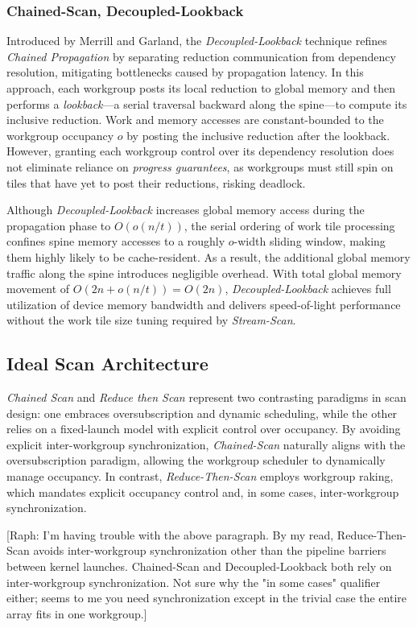 \documentclass[sigconf]{acmart}
\newcommand{\raph}[1]{{\footnotesize\color{magenta}[Raph: #1]}}
\begin{document}
\subsubsection{Chained-Scan, Decoupled-Lookback}
Introduced by Merrill and Garland, the \emph{Decoupled-Lookback} technique refines \emph{Chained Propagation} by separating reduction communication from dependency resolution, mitigating bottlenecks caused by propagation latency. In this approach, each workgroup posts its local reduction to global memory and then performs a \emph{lookback}---a serial traversal backward along the spine---to compute its inclusive reduction. Work and memory accesses are constant-bounded to the workgroup occupancy $o$ by posting the inclusive reduction after the lookback. However, granting each workgroup control over its dependency resolution does not eliminate reliance on \emph{progress guarantees}, as workgroups must still spin on tiles that have yet to post their reductions, risking deadlock.

Although \emph{Decoupled-Lookback} increases global memory access during the propagation phase to $O(o(n/t))$, the serial ordering of work tile processing confines spine memory accesses to a roughly $o$-width sliding window, making them highly likely to be cache-resident. As a result, the additional global memory traffic along the spine introduces negligible overhead. With total global memory movement of $O(2n+o(n/t))= O(2n)$, \emph{Decoupled-Lookback} achieves full utilization of device memory bandwidth and delivers speed-of-light performance without the work tile size tuning required by \emph{Stream-Scan}.

\subsection{Ideal Scan Architecture}
\emph{Chained Scan} and \emph{Reduce then Scan} represent two contrasting paradigms in scan design: one embraces oversubscription and dynamic scheduling, while the other relies on a fixed-launch model with explicit control over occupancy. By avoiding explicit inter-workgroup synchronization, \emph{Chained-Scan} naturally aligns with the oversubscription paradigm, allowing the workgroup scheduler to dynamically manage occupancy. In contrast, \emph{Reduce-Then-Scan} employs workgroup raking, which mandates explicit occupancy control and, in some cases, inter-workgroup synchronization.

\raph{I'm having trouble with the above paragraph. By my read, Reduce-Then-Scan avoids inter-workgroup synchronization other than the pipeline barriers between kernel launches. Chained-Scan and Decoupled-Lookback both rely on inter-workgroup synchronization. Not sure why the "in some cases" qualifier either; seems to me you need synchronization except in the trivial case the entire array fits in one workgroup.}
\end{document}
